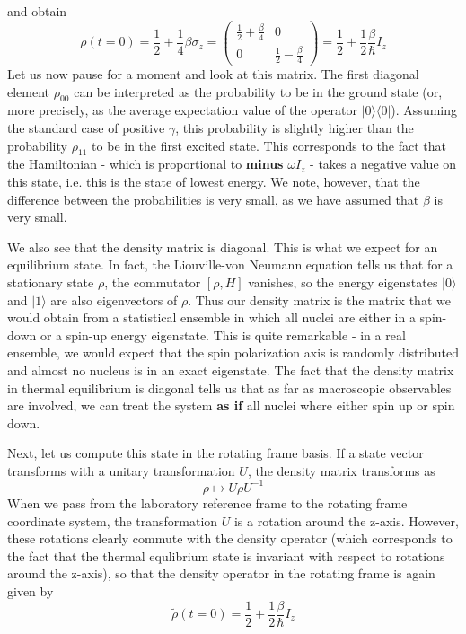 \documentclass[a4paper, draft]{article}
\theoremstyle{own}
\theoremstyle{remark}
\begin{document}
and obtain
$$
\rho(t=0) = \frac{1}{2} + \frac{1}{4} \beta \sigma_z =
\begin{pmatrix}
\frac{1}{2} + \frac{\beta}{4} & 0 \\
0 & \frac{1}{2} - \frac{\beta}{4}
\end{pmatrix} = \frac{1}{2} + \frac{1}{2} \frac{\beta}{\hbar} I_z
$$
Let us now pause for a moment and look at this matrix. The first diagonal element $\rho_{00}$ can be interpreted as the probability to be in the ground state (or, more precisely, as the average expectation value of the operator $|0 \rangle \langle 0 |$). Assuming the standard case of positive $\gamma$, this probability is slightly higher than the probability $\rho_{11}$ to be in the first excited state. This corresponds to the fact that the Hamiltonian - which is proportional to {\bf minus} $\omega I_z$ - takes a negative value on this state, i.e. this is the state of lowest energy. We note, however, that the difference between the probabilities is very small, as we have assumed that $\beta$ is very small. 

We also see that the density matrix is diagonal. This is what we expect for an equilibrium state. In fact, the Liouville-von Neumann equation tells us that for a stationary state $\rho$, the commutator $[\rho, H]$ vanishes, so the energy eigenstates $|0 \rangle$ and $|1 \rangle$ are also eigenvectors of $\rho$. Thus our density matrix is the matrix that we would obtain from a statistical ensemble in which all nuclei are either in a spin-down or a spin-up energy eigenstate. This is quite remarkable - in a real ensemble, we would expect that the spin polarization axis is randomly distributed and almost no nucleus is in an exact eigenstate. The fact that the density matrix in thermal equilibrium is diagonal tells us that as far as macroscopic observables are involved, we can treat the system {\bf as if} all nuclei where either spin up or spin down. 

Next, let us compute this state in the rotating frame basis. If a state vector transforms with a unitary transformation $U$, the density matrix transforms as
$$
\rho \mapsto U \rho U^{-1}
$$
When we pass from the laboratory reference frame to the rotating frame coordinate system, the transformation $U$ is a rotation around the z-axis. However, these rotations clearly commute with the density operator (which corresponds to the fact that the thermal equlibrium state is invariant with respect to rotations around the z-axis), so that the density operator in the rotating frame is again given by
$$
\widetilde{\rho} (t=0) = \frac{1}{2} + \frac{1}{2} \frac{\beta}{\hbar} I_z
$$
\end{document}
